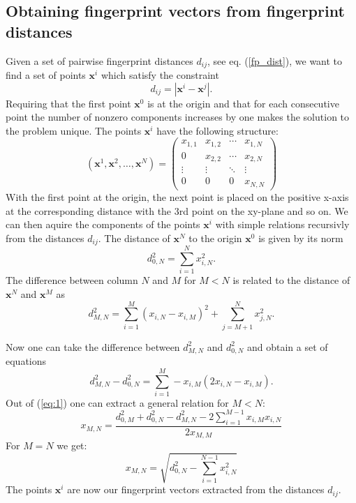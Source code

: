 \subsection{Obtaining fingerprint vectors from fingerprint distances}
Given a set of pairwise fingerprint distances $d_{ij}$, see eq. (\ref{fp_dist}), we want to find a set of points $\mathbf{x}^i$ which satisfy the constraint
\begin{equation}d_{ij}=|\mathbf{x}^i-\mathbf{x}^j|.\end{equation}
Requiring that the first point $\mathbf{x}^0$ is at the origin and that for each consecutive point the number of nonzero components increases by one makes the solution to the problem unique. The points $\mathbf{x}^i$ have the following structure:
\begin{equation} (\mathbf{x}^1, \mathbf{x}^2, \ldots, \mathbf{x}^N) = 
\left(\begin{matrix}
x_{1,1} & x_{1,2} & \cdots & x_{1,N} \\
0 & x_{2,2} &\cdots & x_{2,N} \\
\vdots & \vdots & \ddots & \vdots \\
0 & 0 & 0 & x_{N,N}   
\end{matrix}\right)
\end{equation}
With the first point at the origin, the next point is placed on the positive x-axis at the corresponding distance with the 3rd point on the xy-plane and so on. We can then aquire the components of the points $\mathbf{x}^i$ with simple relations recursivly from the distances $d_{ij}$. The distance of $\mathbf{x}^N$ to the origin $\mathbf{x}^0$ is given by its norm
\begin{equation}d_{0,N}^2=\sum_{i=1}^N x_{i,N}^2.\end{equation}
The difference between column $N$ and $M$ for $M<N$ is related to the distance of $\mathbf{x}^N$ and $\mathbf{x}^M$ as
\begin{equation}\label{eq:1}
 d^2_{M,N}=\sum_{i=1}^M(x_{i,N}-x_{i,M})^2+\sum_{j=M+1}^N x^2_{j,N}.\end{equation}

Now one can take the difference between $d^2_{M,N}$ and $d^2_{0,N}$ and obtain a set of equations
\begin{equation}d^2_{M,N}-d^2_{0,N}=\sum_{i=1}^M -x_{i,M}(2x_{i,N} - x_{i,M}).\end{equation}
Out of (\ref{eq:1}) one can extract a general relation for $M<N$:
\begin{equation}
x_{M,N}=\frac{d^2_{0,M}+d^2_{0,N}-d^2_{M,N}-2\sum_{i=1}^{M-1} x_{i,M} x_{i,N} } {2x_{M,M}}
\end{equation}
For $M=N$ we get:
\begin{equation}
x_{M,N}=\sqrt{d^2_{0,N}-\sum_{i=1}^{N-1}x^2_{i,N}}
\end{equation}
The points $\mathbf{x}^i$ are now our fingerprint vectors extracted from the distances $d_{ij}$. 
